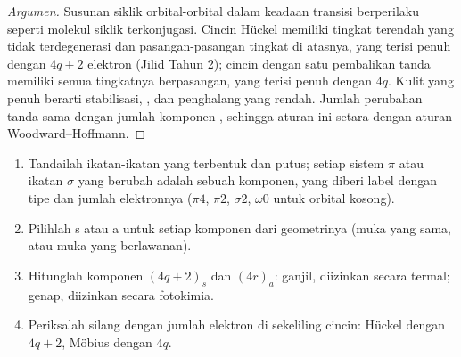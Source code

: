 \begin{proof}[Argumen]
Susunan siklik orbital-orbital dalam keadaan transisi berperilaku seperti molekul
siklik terkonjugasi. Cincin Hückel memiliki tingkat terendah yang tidak terdegenerasi dan pasangan-pasangan tingkat
di atasnya, yang terisi penuh dengan $4q + 2$ elektron (Jilid Tahun 2); cincin dengan satu
pembalikan tanda memiliki semua tingkatnya berpasangan, yang terisi penuh dengan $4q$. Kulit yang penuh berarti
stabilisasi, , dan penghalang yang rendah. Jumlah perubahan
tanda sama dengan jumlah komponen , sehingga aturan ini setara dengan
aturan Woodward--Hoffmann.
\end{proof}

\begin{method}\label{met:b3:pericyclic:components}
\begin{enumerate}
  \item Tandailah ikatan-ikatan yang terbentuk dan putus; setiap sistem $\pi$ atau ikatan $\sigma$ yang berubah adalah sebuah
        komponen, yang diberi label dengan tipe dan jumlah elektronnya ($\pi4$, $\pi2$, $\sigma2$, $\omega0$ untuk
        orbital kosong).
  \item Pilihlah s atau a untuk setiap komponen dari geometrinya (muka yang sama, atau
        muka yang berlawanan).
  \item Hitunglah komponen $(4q + 2)_s$ dan $(4r)_a$: ganjil, diizinkan secara termal; genap, diizinkan
        secara fotokimia.
  \item Periksalah silang dengan jumlah elektron di sekeliling cincin: Hückel dengan $4q + 2$,
        Möbius dengan $4q$.
\end{enumerate}
\end{method}

